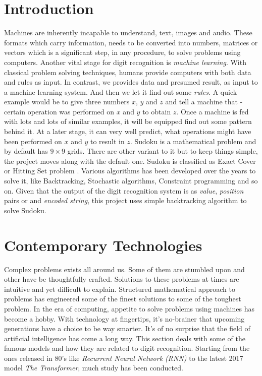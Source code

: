 \documentclass[twocolumn, switch]{article} %
\begin{document}
\section{Introduction}
\label{sec:introduction}
Machines are inherently incapable to understand, text, images and audio. These formats which carry information, needs to be converted into numbers, matrices or vectors which is a significant step, in any procedure, to solve problems using computers. Another vital stage for digit recognition is \emph{machine learning}. With classical problem solving techniques, humans provide computers with both data and rules as input. In contrast, we provides data and presumed result, as input to a machine learning system. And then we let it find out some \emph{rules}. A quick example would be to give three numbers $x$, $y$ and $z$ and tell a machine that - certain operation was performed on $x$ and $y$ to obtain $z$. Once a machine is fed with lots and lots of similar examples, it will be equipped find out some pattern behind it. At a later stage, it can very well predict, what operations might have been performed on $x$ and $y$ to result in $z$. Sudoku is a mathematical problem and by default has $9\times 9$ grids. There are other variant to it but to keep things simple, the project moves along with the default one. Sudoku is classified as Exact Cover or Hitting Set problem \cite{wiki:exactcover}. Various algorithms has been developed over the years to solve it, like Backtracking, Stochastic algorithms, Constraint programming and so on. Given that the output of the digit recognition system is as \emph{value}, \emph{position} pairs or and \emph{encoded string}, this project uses simple backtracking algorithm to solve Sudoku.


\section{Contemporary Technologies}
\label{sec:contemporaryTech}
Complex problems exists all around us. Some of them are stumbled upon and other have be thoughtfully crafted. Solutions to these problems at times are intuitive and yet difficult to explain. Structured mathematical approach to problems has engineered some of the finest solutions to some of the toughest problem. In the era of computing, appetite to solve problems using machines has become a hobby. With technology at fingertips, it's no-brainer that upcoming generations have a choice to be way smarter. It's of no surprise that the field of artificial intelligence has come a long way. This section deals with some of the famous models and how they are related to digit recognition. Starting from the ones released in 80's like \emph{Recurrent Neural Network (RNN)} to the latest 2017 model \emph{The Transformer}, much study has been conducted.
\end{document}
